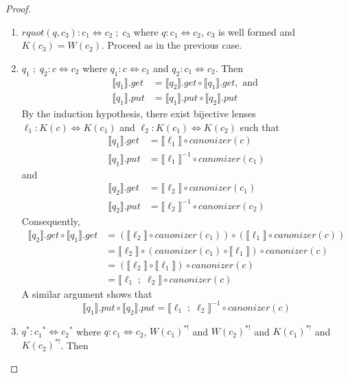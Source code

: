 \documentclass[acmsmall,review,anonymous]{acmart}
\newcommand{\kw}[1]{\ensuremath{\mathit{#1}}}
\newcommand{\canonizer}{\ensuremath{\kw{canonizer}}}
\newcommand{\get}{\ensuremath{\kw{get}}}
\newcommand{\lput}{\ensuremath{\kw{put}}}
\begin{document}
\begin{proof}
\begin{enumerate}
\item
$\kw{rquot}(q, c_3):c_1 \Leftrightarrow c_2 \; ; \; c_3$ where $q : c_1
\Leftrightarrow c_2$, $c_3$ is well formed and $K(c_3) = W(c_2)$. Proceed as in
the previous case.
\item
$q_1 \; ; \; q_2: c \Leftrightarrow c_2$ where $q_1 : c \Leftrightarrow c_1$ and
$q_2 : c_1 \Leftrightarrow c_2$. Then
\begin{align*}
\llbracket q_1 \rrbracket.\get &= \llbracket q_2 \rrbracket.\get\circ \llbracket
q_1 \rrbracket.\get, \text{ and }\\
\llbracket q_1 \rrbracket.\lput &= \llbracket q_1 \rrbracket.\lput \circ \llbracket
q_2 \rrbracket.\lput
\end{align*}
By the induction hypothesis, there exist bijective lenses
$\ell_1 :
K(c) \Leftrightarrow K(c_1)$ and $\ell_2 : K(c_1) \Leftrightarrow K(c_2)$ such
that
\begin{align*}
\llbracket q_1 \rrbracket.\get &= \llbracket \ell_1 \rrbracket \circ
\canonizer(c)\\
\llbracket q_1 \rrbracket.\lput &= {\llbracket \ell_1 \rrbracket}^{-1} \circ
\canonizer(c_1)
\end{align*}
and
\begin{align*}
\llbracket q_2 \rrbracket.\get &= \llbracket \ell_2 \rrbracket \circ
\canonizer(c_1)\\
\llbracket q_2 \rrbracket.\lput &= {\llbracket \ell_2 \rrbracket}^{-1} \circ
\canonizer(c_2)
\end{align*}
Consequently,
\begin{align*}
\llbracket q_2 \rrbracket.\get \circ \llbracket q_1 \rrbracket.\get &=
(\llbracket \ell_2 \rrbracket \circ \canonizer(c_1)) \circ (\llbracket \ell_1
\rrbracket \circ \canonizer(c))\\
&= \llbracket \ell_2 \rrbracket \circ (\canonizer(c_1) \circ \llbracket \ell_1
\rrbracket) \circ \canonizer(c)\\
&= (\llbracket \ell_2 \rrbracket \circ \llbracket \ell_1 \rrbracket) \circ
\canonizer(c)\\
&= \llbracket \ell_1 \; ; \; \ell_2 \rrbracket \circ
\canonizer(c)
\end{align*}
A similar argument shows that
$$\llbracket q_1 \rrbracket.\lput \circ \llbracket q_2 \rrbracket.\lput =
\llbracket \ell_1 \; ; \; \ell_2 \rrbracket^{-1} \circ
\canonizer(c)$$
\item
$q^* : {c_1}^* \Leftrightarrow {c_2}^*$ where $q : c_1 \Leftrightarrow c_2$,
$W(c_1)^{*!}$ and $W(c_2)^{*!}$ and $K(c_1)^{*!}$ and $K(c_2)^{*!}$. Then

\end{enumerate}
\end{proof}
\end{document}
